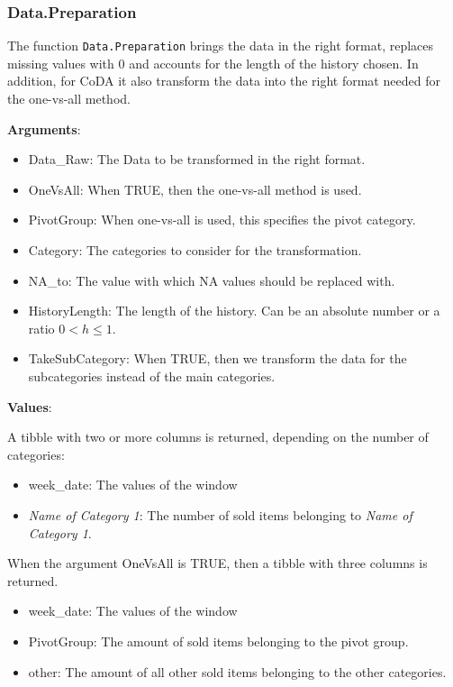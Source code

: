 \subsubsection{Data.Preparation}
\label{sec:Data.Preparation}

The function \texttt{Data.Preparation} brings the data in the right format, replaces missing values with 0 and accounts for the length of the history chosen. In addition, for CoDA it also transform the data into the right format needed for the one-vs-all method.

\textbf{Arguments}:

\begin{itemize}
	\item Data\_Raw: The Data to be transformed in the right format.
  \item OneVsAll: When TRUE, then the one-vs-all method is used.
  \item PivotGroup: When one-vs-all is used, this specifies the pivot category.
  \item Category: The categories to consider for the transformation.
  \item NA\_to: The value with which NA values should be replaced with.
  \item HistoryLength: The length of the history. Can be an absolute number or a ratio $0<h\leq 1$. 
  \item TakeSubCategory: When TRUE, then we transform the data for the subcategories instead of the main categories. 
\end{itemize}

\textbf{Values}:

A tibble with two or more columns is returned, depending on the number of categories: 

\begin{itemize}
	\item week\_date: The values of the window
	\item \textit{Name of Category 1}: The number of sold items belonging to \textit{Name of Category 1}.
\end{itemize}

When the argument OneVsAll is TRUE, then a tibble with three columns is returned.


\begin{itemize}
	\item week\_date: The values of the window
	\item PivotGroup: The amount of sold items belonging to the pivot group.
	\item other: The amount of all other sold items belonging to the other categories. 
\end{itemize}

